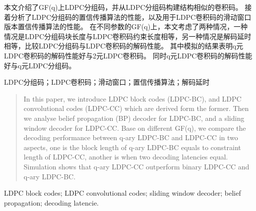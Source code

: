 

\begin{zhaiyao}
本文介绍了GF(q)上LDPC分组码，并从LDPC分组码构建结构相似的卷积码。
接着分析了LDPC分组码的置信传播算法的性能，以及用于LDPC卷积码的滑动窗口版本置信传播算法的性能。
在不同参数的GF(q)上，本文考虑了两种情况，一种情况是LDPC分组码块长度与LDPC卷积码约束长度相等，另一种情况是解码延时相等，比较LDPC分组码与LDPC卷积码的解码性能。
其中模拟的结果表明q元LDPC卷积码的解码性能好与2元LDPC卷积码。
同时q元LDPC卷积码的解码性能好与q元LDPC分组码。
\end{zhaiyao}


\begin{guanjianci}
LDPC分组码；LDPC卷积码；滑动窗口；置信传播算法；解码延时
\end{guanjianci}



\begin{abstract}
In this paper, we introduce LDPC block codes (LDPC-BC), and LDPC convolutional codes (LDPC-CC) which are derived form the former. Then we analyse belief propagation (BP) decoder for LDPC-BC, and a sliding window decoder for LDPC-CC. Base on different GF(q), we compare the decoding performance between q-ary LDPC-BC and LDPC-CC in two aspects, one is the block length of q-ary LDPC-BC equals to constraint length of LDPC-CC, another is when two decoding latencies equal. Simulation shows that q-ary LDPC-CC outperform binary LDPC-CC and q-ary LDPC-BC.
\end{abstract}


\begin{keywords}
LDPC block codes; LDPC convolutional codes; sliding window decoder; belief propagation; decoding latencie.
\end{keywords} 
